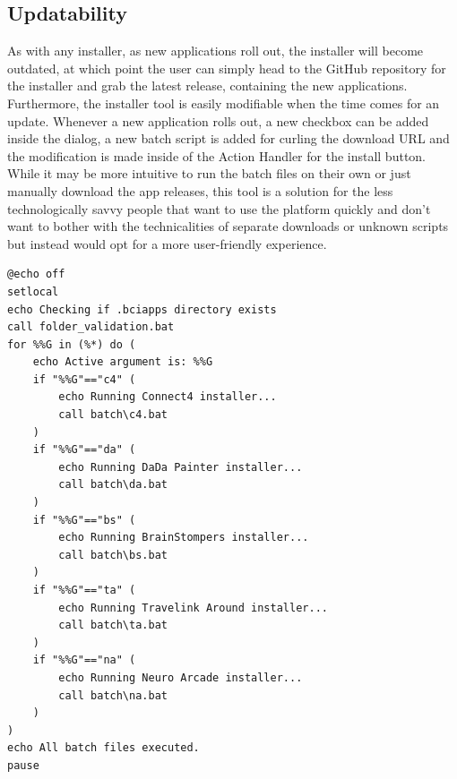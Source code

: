 \subsection{Updatability}
As with any installer, as new applications roll out, the installer will become outdated, at which point the user can simply head to the GitHub repository for the installer and grab the latest release, containing the new applications. Furthermore, the installer tool is easily modifiable when the time comes for an update. Whenever a new application rolls out, a new checkbox can be added inside the dialog, a new batch script is added for curling the download URL and the modification is made inside of the Action Handler for the install button. While it may be more intuitive to run the batch files on their own or just manually download the app releases, this tool is a solution for the less technologically savvy people that want to use the platform quickly and don't want to bother with the technicalities of separate downloads or unknown scripts but instead would opt for a more user-friendly experience.

\begin{lstlisting}[language={[Sharp]C}, caption={Action Handler for the Install Apps button}, label={Script}]
@echo off
setlocal
echo Checking if .bciapps directory exists
call folder_validation.bat
for %%G in (%*) do (
    echo Active argument is: %%G
    if "%%G"=="c4" (
        echo Running Connect4 installer...
        call batch\c4.bat
    )
    if "%%G"=="da" (
        echo Running DaDa Painter installer...
        call batch\da.bat
    )
    if "%%G"=="bs" (
        echo Running BrainStompers installer...
        call batch\bs.bat
    )
    if "%%G"=="ta" (
        echo Running Travelink Around installer...
        call batch\ta.bat
    )
    if "%%G"=="na" (
        echo Running Neuro Arcade installer...
        call batch\na.bat
    )
)
echo All batch files executed.
pause
\end{lstlisting}



